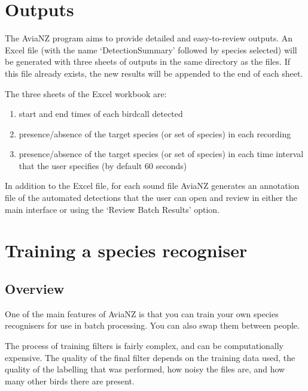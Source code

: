 \documentclass{article}
\begin{document}
\section{Outputs}
\label{sec:outputs}

The AviaNZ program aims to provide detailed and easy-to-review outputs. An Excel file (with the name `DetectionSummary' followed by species selected) will be generated with three sheets of outputs in the same directory as the files. If this file already exists, the new results will be appended to the end of each sheet. 

The three sheets of the Excel workbook are:
\begin{enumerate}
\item start and end times of each birdcall detected
\item presence/absence of the target species (or set of species) in each recording
\item  presence/absence of the target species (or set of species) in each time interval that the user specifies (by default 60 seconds)
\end{enumerate}

In addition to the Excel file, for each sound file AviaNZ generates an annotation file of the automated detections that  the user can open and review in either the main interface or using the `Review Batch Results' option. 

\newpage
\section{Training a species recogniser}\label{sec:trainfilter}

\subsection{Overview}

One of the main features of AviaNZ is that you can train your own species recognisers for use in batch processing. You can also swap them between people.%

The process of training filters is fairly complex, and can be computationally expensive. The quality of the final filter depends on the training data used, the quality of the labelling that was performed, how noisy the files are, and how many other birds there are present.
\end{document}
